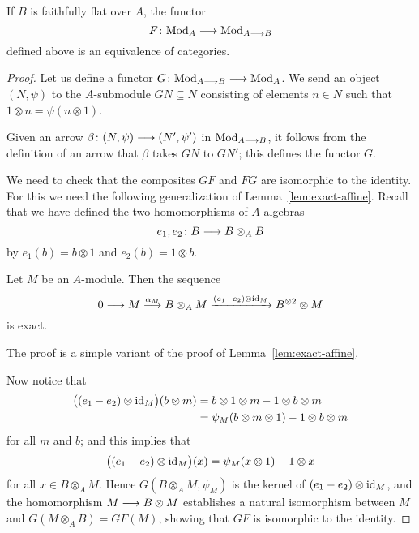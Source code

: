 \begin{4   STACKS}
\begin{4.2 Descent for quasi-coherent sheaves}
\begin{theorem}\label{thm:main-affine}
If $B$ is faithfully flat over $A$, the functor
   \[
   F \colon \catmod{A} \arr \catmod{A \arr B}
   \]
defined above is an equivalence of categories.
\end{theorem}

\begin{proof}
Let us define a functor $G \colon \catmod{A \arr B} \arr \catmod{A}$. We send an object $(N, \psi)$ to the $A$-submodule $GN \subseteq N$ consisting of elements $n \in N$ such that $1 \otimes n = \psi(n
\otimes 1)$.

Given an arrow $\beta \colon (N, \psi) \arr (N', \psi')$ in $\catmod{A \arr B}$, it follows from the definition of an arrow that $\beta$ takes $GN$ to $GN'$; this defines the functor $G$.

We need to check that the composites $GF$ and $FG$ are isomorphic to the identity. For this we need the following generalization of Lemma~\ref{lem:exact-affine}. Recall that we have defined the two homomorphisms of $A$-algebras
   \[
   e_1, e_2 \colon B \arr B \otimes_A B
   \]
by
$e_1(b) = b \otimes 1$ and $e_2(b) = 1 \otimes b$.

\begin{lemma}\label{lem:exact2-affine}
Let $M$ be an $A$-module.
Then the sequence
   \[
   0 \arr M \overset{\alpha_M}
   \larr B \otimes_A  M
   \xrightarrow{(e_1-e_2) \otimes\id_M} B^{\otimes 2}\otimes M
   \]
is exact.
\end{lemma}

The proof is a simple variant of the proof of Lemma~\ref{lem:exact-affine}.

Now notice that
   \begin{align*}
   \bigl((e_1-e_2) \otimes\mathrm{id}_M\bigr)(b \otimes m)
   &{} = b \otimes 1 \otimes m - 1 \otimes b \otimes m\\
   &{} = \psi_M(b \otimes m \otimes 1) - 1 \otimes b \otimes m
   \end{align*}
for all $m$ and $b$; and this implies that 
   \[
   \bigl((e_1-e_2) \otimes\mathrm{id}_M\bigr)(x) = \psi_M(x \otimes 1) - 1 \otimes x
   \]
for all $x \in B \otimes_A M$. Hence $G(B \otimes_A M, \psi_M)$ is the kernel of $(e_1-e_2) \otimes\mathrm{id}_M$, and the homomorphism $M \arr B \otimes M$ establishes a natural isomorphism between $M$ and $G(M \otimes_A B) = GF(M)$, showing that $GF$ is isomorphic to the identity.


\end{proof}
\end{4.2 Descent for quasi-coherent sheaves}
\end{4   STACKS}
